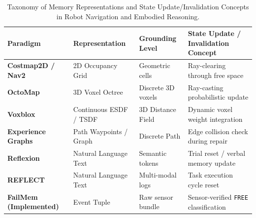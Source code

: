 \begin{table}[t]
\centering
\small
\caption{Taxonomy of Memory Representations and State Update/Invalidation Concepts in Robot Navigation and Embodied Reasoning.}
\label{tab:classification}
\begin{tabular*}{\textwidth}{@{\extracolsep{\fill}}llll@{}}
\toprule
Paradigm & Representation & Grounding Level & State Update / Invalidation Concept \\
\midrule
\textbf{Costmap2D / Nav2} \cite{lu2014layered} & 2D Occupancy Grid & Geometric cells & Ray-clearing through free space \\
\textbf{OctoMap} \cite{hornung2013octomap} & 3D Voxel Octree & Discrete 3D voxels & Ray-casting probabilistic update \\
\textbf{Voxblox} \cite{oleynikova2017voxblox} & Continuous ESDF / TSDF & 3D Distance Field & Dynamic voxel weight integration \\
\textbf{Experience Graphs} \cite{phillips2012egraphs} & Path Waypoints / Graph & Discrete Path & Edge collision check during repair \\
\textbf{Reflexion} \cite{shinn2023reflexion} & Natural Language Text & Semantic tokens & Trial reset / verbal memory update \\
\textbf{REFLECT} \cite{liu2023reflect} & Natural Language Text & Multi-modal logs & Task execution cycle reset \\
\textbf{FailMem (Implemented)} & Event Tuple & Raw sensor bundle & Sensor-verified \texttt{FREE} classification \\
\bottomrule
\end{tabular*}
\end{table}
